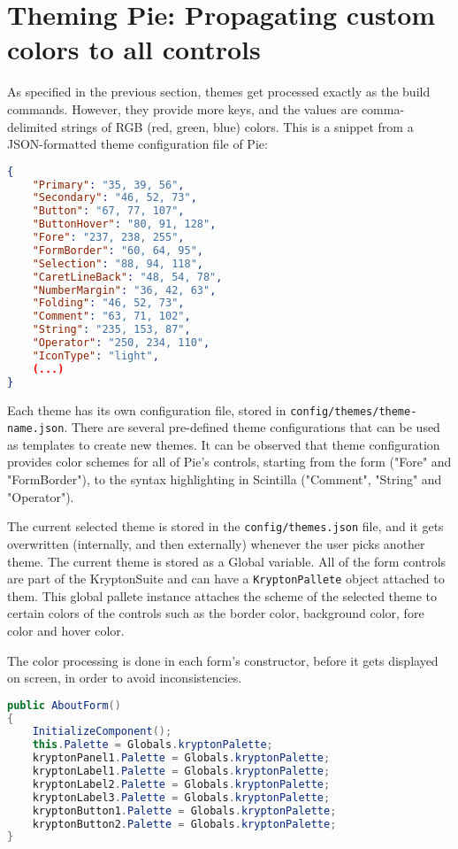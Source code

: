 \section{Theming Pie: Propagating custom colors to all controls}

As specified in the previous section, themes get processed exactly as the build commands. However, they provide more keys, and the values are comma-delimited strings of RGB (red, green, blue) colors. This is a snippet from a JSON-formatted theme configuration file of Pie:

\begin{lstlisting}[language=json, caption={Theme configuration example in Pie}]
{
	"Primary": "35, 39, 56",
	"Secondary": "46, 52, 73",
	"Button": "67, 77, 107",
	"ButtonHover": "80, 91, 128",
	"Fore": "237, 238, 255",
	"FormBorder": "60, 64, 95",
	"Selection": "88, 94, 118",
	"CaretLineBack": "48, 54, 78",
	"NumberMargin": "36, 42, 63",
	"Folding": "46, 52, 73",
	"Comment": "63, 71, 102",
    "String": "235, 153, 87",
	"Operator": "250, 234, 110",
    "IconType": "light",
    (...)
}
\end{lstlisting}

Each theme has its own configuration file, stored in \texttt{config/themes/theme-name.json}. There are several pre-defined theme configurations that can be used as templates to create new themes. It can be observed that theme configuration provides color schemes for all of Pie's controls, starting from the form ("Fore" and "FormBorder"), to the syntax highlighting in Scintilla ("Comment", "String" and "Operator").

The current selected theme is stored in the \texttt{config/themes.json} file, and it gets overwritten (internally, and then externally) whenever the user picks another theme. The current theme is stored as a Global variable. All of the form controls are part of the KryptonSuite and can have a \texttt{KryptonPallete} object attached to them. This global pallete instance attaches the scheme of the selected theme to certain colors of the controls such as the border color, background color, fore color and hover color.

The color processing is done in each form's constructor, before it gets displayed on screen, in order to avoid inconsistencies.

\begin{lstlisting}[language=csharp, caption={The constructor of AboutForm, setting colors defined in the global color palette instance to each control present in the form}]
public AboutForm()
{
    InitializeComponent();
    this.Palette = Globals.kryptonPalette;
    kryptonPanel1.Palette = Globals.kryptonPalette;
    kryptonLabel1.Palette = Globals.kryptonPalette;
    kryptonLabel2.Palette = Globals.kryptonPalette;
    kryptonLabel3.Palette = Globals.kryptonPalette;
    kryptonButton1.Palette = Globals.kryptonPalette;
    kryptonButton2.Palette = Globals.kryptonPalette;
}
\end{lstlisting}

